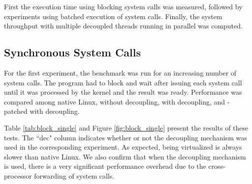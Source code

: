 First the execution time using blocking system calls was measured, followed by
experiments using batched execution of system calls. Finally, the system
throughput with multiple decoupled threads running in parallel was computed.

\subsection{Synchronous System Calls}

For the first experiment, the benchmark was run for an increasing number of
system calls. The program had to block and wait after issuing each system call
until it was processed by the kernel and the result was ready. Performance was
compared among native Linux, \llinux without decoupling, \llinux with
decoupling, and \memsc-patched \llinux with decoupling.

Table \ref{tab:block_single} and Figure \ref{fig:block_single} present the
results of these tests. The ``dec" column indicates whether or not the
decoupling mechanism was used in the corresponding experiment. As expected,
\llinux being virtualized is always slower than native Linux. We also confirm
that when the decoupling mechanism is used, there is a very significant
performance overhead due to the cross-processor forwarding of system calls.

\newcommand\Aa{4}
\newcommand\Ab{7}
\newcommand\Ac{39}
\newcommand\Ad{307}
\newcommand\Ae{2938}
\newcommand\Af{25618}

\newcommand\Ba{10}
\newcommand\Bb{41}
\newcommand\Bc{348}
\newcommand\Bd{3423}
\newcommand\Be{34260}
\newcommand\Bf{342381}

\newcommand\Ca{36}
\newcommand\Cb{278}
\newcommand\Cc{2701}
\newcommand\Cd{26949}
\newcommand\Ce{269664}
\newcommand\Cf{2705248}

\newcommand\Da{27}
\newcommand\Db{143}
\newcommand\Dc{1205}
\newcommand\Dd{11702}
\newcommand\De{116112}
\newcommand\Df{1163886}

